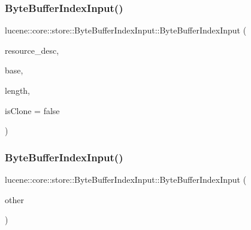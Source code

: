 \subsubsection{\texorpdfstring{Byte\+Buffer\+Index\+Input()}{ByteBufferIndexInput()}\hspace{0.1cm}{\footnotesize\ttfamily [1/3]}}
{\footnotesize\ttfamily lucene\+::core\+::store\+::\+Byte\+Buffer\+Index\+Input\+::\+Byte\+Buffer\+Index\+Input (\begin{DoxyParamCaption}\item[{\mbox{\hyperlink{ZlibCrc32_8h_a2c212835823e3c54a8ab6d95c652660e}{const}} std\+::string \&}]{resource\+\_\+desc,  }\item[{\mbox{\hyperlink{ZlibCrc32_8h_a2c212835823e3c54a8ab6d95c652660e}{const}} char $\ast$}]{base,  }\item[{\mbox{\hyperlink{ZlibCrc32_8h_a2c212835823e3c54a8ab6d95c652660e}{const}} uint64\+\_\+t}]{length,  }\item[{\mbox{\hyperlink{ZlibCrc32_8h_a2c212835823e3c54a8ab6d95c652660e}{const}} bool}]{is\+Clone = {\ttfamily false} }\end{DoxyParamCaption})\hspace{0.3cm}{\ttfamily [inline]}}

\mbox{\label{classlucene_1_1core_1_1store_1_1ByteBufferIndexInput_a5e4992fba0cac1288d936dc61513e5a3}} 
\subsubsection{\texorpdfstring{Byte\+Buffer\+Index\+Input()}{ByteBufferIndexInput()}\hspace{0.1cm}{\footnotesize\ttfamily [2/3]}}
{\footnotesize\ttfamily lucene\+::core\+::store\+::\+Byte\+Buffer\+Index\+Input\+::\+Byte\+Buffer\+Index\+Input (\begin{DoxyParamCaption}\item[{\mbox{\hyperlink{ZlibCrc32_8h_a2c212835823e3c54a8ab6d95c652660e}{const}} \mbox{\hyperlink{classlucene_1_1core_1_1store_1_1ByteBufferIndexInput}{Byte\+Buffer\+Index\+Input}} \&}]{other }\end{DoxyParamCaption})\hspace{0.3cm}{\ttfamily [inline]}}

